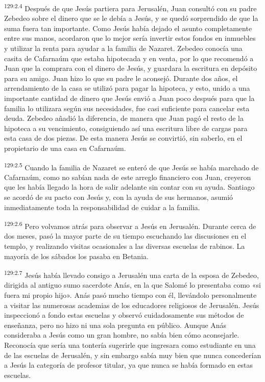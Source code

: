 \par
\textsuperscript{129:2.4} Después de que Jesús partiera para Jerusalén, Juan consultó con su padre Zebedeo sobre el dinero que se le debía a Jesús, y se quedó sorprendido de que la suma fuera tan importante. Como Jesús había dejado el asunto completamente entre sus manos, acordaron que lo mejor sería invertir estos fondos en inmuebles y utilizar la renta para ayudar a la familia de Nazaret. Zebedeo conocía una casita de Cafarnaúm que estaba hipotecada y en venta, por lo que recomendó a Juan que la comprara con el dinero de Jesús, y guardara la escritura en depósito para su amigo. Juan hizo lo que su padre le aconsejó. Durante dos años, el arrendamiento de la casa se utilizó para pagar la hipoteca, y esto, unido a una importante cantidad de dinero que Jesús envió a Juan poco después para que la familia lo utilizara según sus necesidades, fue casi suficiente para cancelar esta deuda. Zebedeo añadió la diferencia, de manera que Juan pagó el resto de la hipoteca a su vencimiento, consiguiendo así una escritura libre de cargas para esta casa de dos piezas. De esta manera Jesús se convirtió, sin saberlo, en el propietario de una casa en Cafarnaúm.

\par
\textsuperscript{129:2.5} Cuando la familia de Nazaret se enteró de que Jesús se había marchado de Cafarnaúm, como no sabían nada de este arreglo financiero con Juan, creyeron que les había llegado la hora de salir adelante sin contar con su ayuda. Santiago se acordó de su pacto con Jesús y, con la ayuda de sus hermanos, asumió inmediatamente toda la responsabilidad de cuidar a la familia.

\par
\textsuperscript{129:2.6} Pero volvamos atrás para observar a Jesús en Jerusalén. Durante cerca de dos meses, pasó la mayor parte de su tiempo escuchando las discusiones en el templo, y realizando visitas ocasionales a las diversas escuelas de rabinos. La mayoría de los sábados los pasaba en Betania.

\par
\textsuperscript{129:2.7} Jesús había llevado consigo a Jerusalén una carta de la esposa de Zebedeo, dirigida al antiguo sumo sacerdote Anás, en la que Salomé lo presentaba como «si fuera mi propio hijo». Anás pasó mucho tiempo con él, llevándolo personalmente a visitar las numerosas academias de los educadores religiosos de Jerusalén. Jesús inspeccionó a fondo estas escuelas y observó cuidadosamente sus métodos de enseñanza, pero no hizo ni una sola pregunta en público. Aunque Anás consideraba a Jesús como un gran hombre, no sabía bien cómo aconsejarle. Reconocía que sería una tontería sugerirle que ingresara como estudiante en una de las escuelas de Jerusalén, y sin embargo sabía muy bien que nunca concederían a Jesús la categoría de profesor titular, ya que nunca se había formado en estas escuelas.

